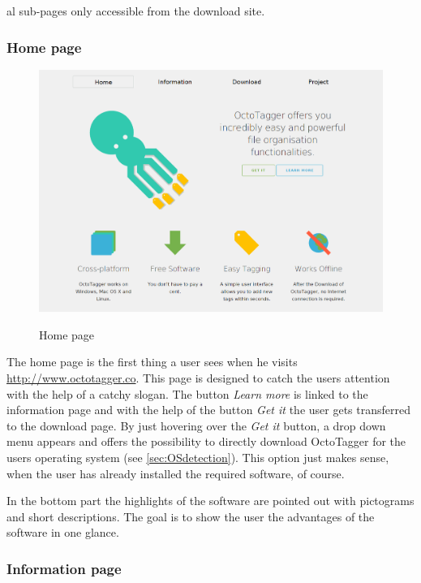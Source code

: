 al sub-pages only accessible from the download site.

\subsubsection{Home page}

\begin{figure}
\centering
\includegraphics[scale=0.35]{images/home_full.png}\\
\caption{Home page}
\end{figure}

The home page is the first thing a user sees when he visits \url{http://www.octotagger.co}. This page is designed to catch the users attention with the help of a catchy slogan. The button \textit{Learn more} is linked to the information page and with the help of the button \textit{Get it} the user gets transferred to the download page. By just hovering over the \textit{Get it} button, a drop down menu appears and offers the possibility to directly download OctoTagger for the users operating system (see \ref{sec:OSdetection}). This option just makes sense, when the user has already installed the required software, of course.

In the bottom part the highlights of the software are pointed out with pictograms and short descriptions. The goal is to show the user the advantages of the software in one glance.

\subsubsection{Information page}

